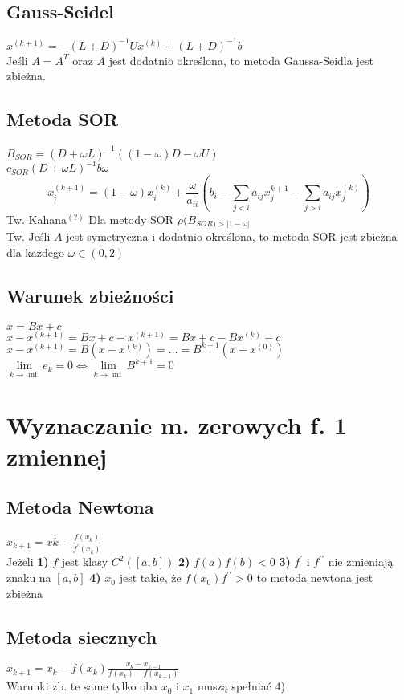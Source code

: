 \documentclass[twocolumn]{article}
\begin{document}
\begin{flushleft}
\subsection{Gauss-Seidel}
$x^{(k+1)} = -(L+D)^{-1}Ux^{(k)}+(L+D)^{-1}b$\\
Jeśli $A=A^T$ oraz $A$ jest dodatnio określona, to metoda Gaussa-Seidla jest zbieżna.
\subsection{Metoda SOR}
$B_{SOR} = (D + \omega L)^{-1}((1- \omega)D - \omega U)$\\
$c_{SOR}(D+\omega L)^{-1}b \omega$\\
$$x_i^{(k+1)} = (1 - \omega)x_i^{(k)} + \frac{\omega}{a_{ii}}\left( b_i- \sum_{j<i}a_{ij}x_j^{k+1} - \sum_{j>i}a_{ij}x_j^{(k)} \right)$$
Tw. Kahana$^{(?)}$ Dla metody SOR $\rho(B_{SOR)>|1-\omega|}$\\
Tw. Jeśli $A$ jest symetryczna i dodatnio określona, to metoda SOR jest zbieżna dla każdego $\omega \in (0,2)$
\subsection{Warunek zbieżności}
\thispagestyle{empty} %
$x = Bx + c$\\
$x - x^{(k+1)} = Bx + c - x^{(k+1)} = Bx+c -Bx^{(k)}-c$\\
$x-x^{(k+1)} = B(x-x^{(k)}) = \ldots = B^{k+1}(x-x^{(0)})$\\
$\underset{k \to \inf}{\lim} e_k = 0 \Leftrightarrow \underset{k \to \inf}{\lim} B^{k+1} = 0$
\section{Wyznaczanie m. zerowych f. 1 zmiennej}
\subsection{Metoda Newtona}
$x_{k+1}=x{k}-\frac{f(x_k)}{f^{\prime}(x_k)}$\\
Jeżeli \textbf{1)} $f$ jest klasy $C^2([a,b])$ \textbf{2)} $f(a)f(b)<0$  \textbf{3)} $f^{\prime}$ i $f^{\prime \prime}$ nie zmieniają znaku na $[a,b]$ \textbf{4)} $x_0$ jest takie, że $f(x_0)f^{\prime \prime} > 0$ to metoda newtona jest zbieżna\\
\subsection{Metoda siecznych}
$x_{k+1} = x_k - f(x_k)\frac{x_k-x_{k-1}}{f(x_k)-f(x_{k-1})}$\\
Warunki zb. te same tylko oba $x_0$ i $x_1$ muszą spełniać 4)\\

\end{flushleft}
\end{document}
